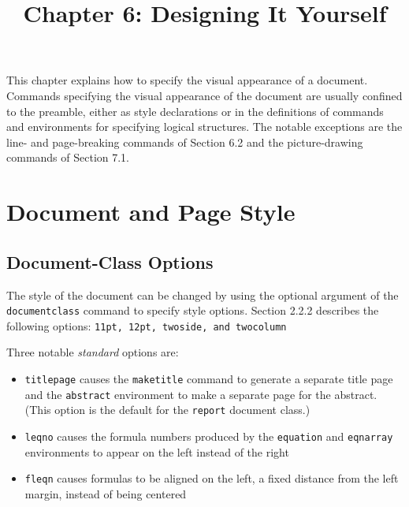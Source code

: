 \documentclass{article}
\title{Chapter 6: Designing It Yourself} %
\author{}
\date{}
\begin{document}
\maketitle %

This chapter explains how to specify the visual appearance of a document. Commands specifying the
visual appearance of the document are usually confined to the preamble, either as style
declarations or in the definitions of commands and environments for specifying logical structures.
The notable exceptions are the line- and page-breaking commands of Section 6.2 and the
picture-drawing commands of Section 7.1.

\section{Document and Page Style}

\subsection{Document-Class Options}

The style of the document can be changed by using the optional argument of the \verb:documentclass:
command to specify style options. Section 2.2.2 describes the following options: 
\verb:11pt, 12pt, twoside, and twocolumn:

Three notable \emph{standard} options are:

\begin{itemize}
   
   \item {\tt titlepage} causes the \verb:maketitle: command to generate a separate title page and
    the {\tt abstract} environment to make a separate page for the abstract. (This option is the
    default for the {\tt report} document class.)
   
   \item {\tt leqno} causes the formula numbers produced by the {\tt equation} and {\tt eqnarray}
    environments to appear on the left instead of the right
   
   \item {\tt fleqn} causes formulas to be aligned on the left, a fixed distance from the left
    margin, instead of being centered
\end{itemize}
\end{document}
